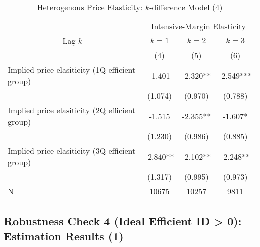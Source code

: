 \documentclass[ review  , 3p ]{elsarticle}
\begin{document}
  \begin{table}
  
  \caption{\label{tab:kableHeterokDiffElasticitySlide4}Heterogenous Price Elasticity: $k$-difference Model (4)}
  \centering
  \fontsize{8}{10}\selectfont
  \begin{tabular}[t]{lccc}
  \toprule
  \multicolumn{1}{c}{ } & \multicolumn{3}{c}{Intensive-Margin Elasticity} \\
  \cmidrule(l{3pt}r{3pt}){2-4}
  \multicolumn{1}{c}{Lag $k$} & \multicolumn{1}{c}{$k = 1$} & \multicolumn{1}{c}{$k = 2$} & \multicolumn{1}{c}{$k = 3$} \\
  \cmidrule(l{3pt}r{3pt}){1-1} \cmidrule(l{3pt}r{3pt}){2-2} \cmidrule(l{3pt}r{3pt}){3-3} \cmidrule(l{3pt}r{3pt}){4-4}
   & (4) & (5) & (6)\\
  \midrule
  Implied price elasiticity (1Q efficient group) & -1.401 & -2.320** & -2.549***\\
   & (1.074) & (0.970) & (0.788)\\
  Implied price elasiticity (2Q efficient group) & -1.515 & -2.355** & -1.607*\\
   & (1.230) & (0.986) & (0.885)\\
  Implied price elasiticity (3Q efficient group) & -2.840** & -2.102** & -2.248**\\
   & (1.317) & (0.995) & (0.973)\\
  N & 10675 & 10257 & 9811\\
  \bottomrule
  \end{tabular}
  \end{table}
  
  \hypertarget{robustness-check-4-ideal-efficient-id-0-estimation-results-1}{%
  \subsection{Robustness Check 4 (Ideal Efficient ID \textgreater{} 0): Estimation Results (1)}\label{robustness-check-4-ideal-efficient-id-0-estimation-results-1}}
  
\end{document}
